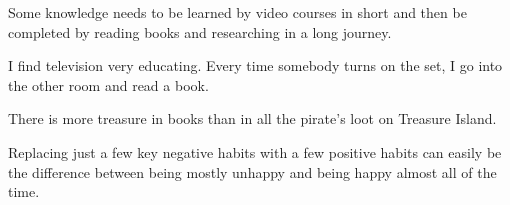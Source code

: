 \documentclass[12pt, dvipsnames, svgnames, x11names, oneside]{book}
\begin{document}
	\mainmatter		
	
	\begin{savequote}[80mm]
		Some knowledge needs to be learned by video courses in short and then be completed by reading books and researching in a long journey.
	\end{savequote}
	
	
	\begin{savequote}[80mm]
		I find television very educating. Every time somebody turns on the set, I go into the other room and read a book.
		
		There is more treasure in books than in all the pirate’s loot on Treasure Island.
	\end{savequote}
	
	
	\begin{savequote}[80mm]
		Replacing just a few key negative habits with a few positive habits can easily be the difference between being mostly unhappy and being happy almost all of the time.
	\end{savequote}
	
	
\end{document}
